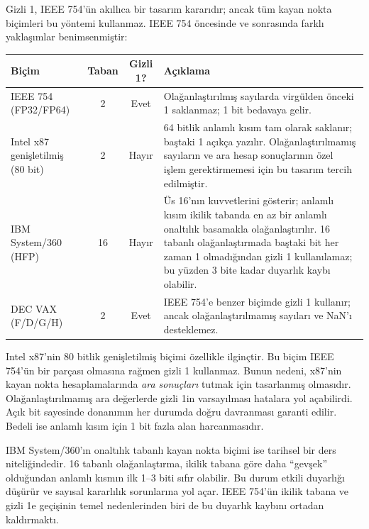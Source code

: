 \begin{bilginot}
Gizli 1, IEEE 754'ün akıllıca bir tasarım kararıdır; ancak tüm kayan nokta biçimleri bu yöntemi kullanmaz. IEEE 754 öncesinde ve sonrasında farklı yaklaşımlar benimsenmiştir:

\begin{center}
\small
\begin{tabularx}{\textwidth}{l c c X}
\toprule
\textbf{Biçim} & \textbf{Taban} & \textbf{Gizli 1?} & \textbf{Açıklama} \\
\midrule
IEEE 754 (FP32/FP64) & 2 & Evet & Olağanlaştırılmış sayılarda virgülden önceki 1 saklanmaz; 1 bit bedavaya gelir. \\[3pt]
Intel x87 genişletilmiş (80 bit) & 2 & Hayır & 64 bitlik anlamlı kısım tam olarak saklanır; baştaki 1 açıkça yazılır. Olağanlaştırılmamış sayıların ve ara hesap sonuçlarının özel işlem gerektirmemesi için bu tasarım tercih edilmiştir. \\[3pt]
IBM System/360 (HFP) & 16 & Hayır & Üs 16'nın kuvvetlerini gösterir; anlamlı kısım ikilik tabanda en az bir anlamlı onaltılık basamakla olağanlaştırılır. 16 tabanlı olağanlaştırmada baştaki bit her zaman 1 olmadığından gizli 1 kullanılamaz; bu yüzden 3 bite kadar duyarlık kaybı olabilir. \\[3pt]
DEC VAX (F/D/G/H) & 2 & Evet & IEEE 754'e benzer biçimde gizli 1 kullanır; ancak olağanlaştırılmamış sayıları ve NaN'ı desteklemez. \\
\bottomrule
\end{tabularx}
\end{center}

Intel x87'nin 80 bitlik genişletilmiş biçimi özellikle ilginçtir. Bu biçim IEEE 754'ün bir parçası olmasına rağmen gizli 1 kullanmaz. Bunun nedeni, x87'nin kayan nokta hesaplamalarında \emph{ara sonuçları} tutmak için tasarlanmış olmasıdır. Olağanlaştırılmamış ara değerlerde gizli 1in varsayılması hatalara yol açabilirdi. Açık bit sayesinde donanımın her durumda doğru davranması garanti edilir. Bedeli ise anlamlı kısım için 1 bit fazla alan harcanmasıdır.

IBM System/360'ın onaltılık tabanlı kayan nokta biçimi ise tarihsel bir ders niteliğindedir. 16 tabanlı olağanlaştırma, ikilik tabana göre daha ``gevşek'' olduğundan anlamlı kısmın ilk 1--3 biti sıfır olabilir. Bu durum etkili duyarlığı düşürür ve sayısal kararlılık sorunlarına yol açar. IEEE 754'ün ikilik tabana ve gizli 1e geçişinin temel nedenlerinden biri de bu duyarlık kaybını ortadan kaldırmaktı.
\end{bilginot}

